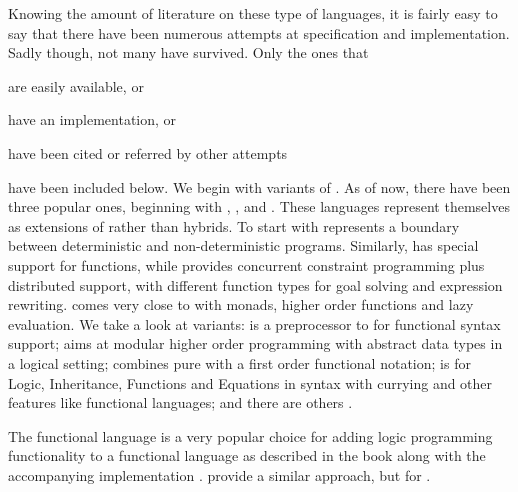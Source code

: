 \documentclass[thesis-solanki.tex]{subfiles}
\begin{document}
Knowing the amount of literature  on these type of languages, it is fairly easy to say that there have been numerous 
attempts at specification and implementation.
Sadly though, not many have survived.
Only the ones that 
\begin{inparaenum}[(a)]
\item
  are easily available, or
\item
  have an implementation, or
\item
  have been cited or referred by other attempts
\end{inparaenum}
have been included below.
We begin with variants of .
As of now, there have been three popular ones, beginning with , \cite{website:nue-prolog},
 \cite{website:oz-mozart} and  \cite{website:mercury}.
These languages represent themselves as extensions of  rather than hybrids.
To start with  represents a boundary between deterministic and non-deterministic programs.
Similarly,  has special support for functions, while  provides concurrent
constraint programming plus distributed support, with different function types for goal solving and expression
rewriting.
 \cite{lloyd1999programming:escher} comes very close to  with monads, higher
order functions and lazy evaluation.
We take a look at  variants:   is a preprocessor to
 for functional syntax support; 
 aims at modular higher order programming with abstract data types in a
logical setting;   combines pure
 with a first order functional notation;   is for
Logic, Inheritance, Functions and Equations in  syntax with currying and other features like
functional languages; and there are others .

The functional language  is a very popular choice for adding logic programming functionality to a
functional language as described in the book \cite{friedman05reasoned} along with the accompanying implementation
\cite{website:kanren,website:minkanren}.
\cite{website:haskellkanren,website:molog,website:minikanrent} provide a similar approach, but for
.
\end{document}
